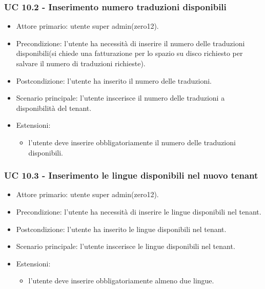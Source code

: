     \subsubsection{UC 10.2 - Inserimento numero traduzioni disponibili}
        \begin{itemize}
            \item Attore primario: utente super admin(zero12).
            \item Precondizione: l'utente ha necessità di inserire il numero delle traduzioni disponibili(si chiede una fatturazione per lo spazio su disco richiesto per salvare il numero di traduzioni richieste).
            \item Postcondizione: l'utente ha inserito il numero delle traduzioni.
            \item Scenario principale: l'utente inscerisce il numero delle traduzioni a disponibilità del tenant.
            \item Estensioni: 
                \begin{itemize}
                    \item l'utente deve inserire obbligatoriamente il numero delle traduzioni disponibili.
                \end{itemize}
        \end{itemize}
        \subsubsection{UC 10.3 - Inserimento le lingue disponibili nel nuovo tenant}%
        \begin{itemize}
            \item Attore primario: utente super admin(zero12).
            \item Precondizione: l'utente ha necessità di inserire le lingue disponibili nel tenant.
            \item Postcondizione: l'utente ha inserito le lingue disponibili nel tenant.
            \item Scenario principale: l'utente inscerisce le lingue disponibili nel tenant.
            \item Estensioni: 
                \begin{itemize}
                    \item l'utente deve inserire obbligatoriamente almeno due lingue.%
                \end{itemize}
        \end{itemize}
